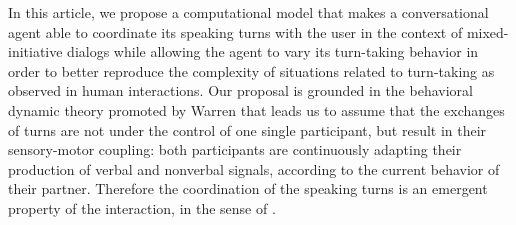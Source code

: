 
In this article, we propose a computational model that makes a conversational agent able to coordinate its speaking turns with the user in the context of mixed-initiative dialogs while allowing the agent to vary its turn-taking behavior in order to better reproduce the complexity of situations related to turn-taking as observed in human interactions. 
Our proposal is grounded in the behavioral dynamic theory promoted by Warren \cite{warren_dynamics_2006} that leads us to assume that the exchanges of turns are not under the control of one single participant, but result in their sensory-motor coupling: both participants are continuously adapting their production of verbal and nonverbal signals, according to the current behavior of their partner. Therefore the coordination of the speaking turns is an emergent property of the interaction, in the sense of \cite{warren_dynamics_2006}. 



